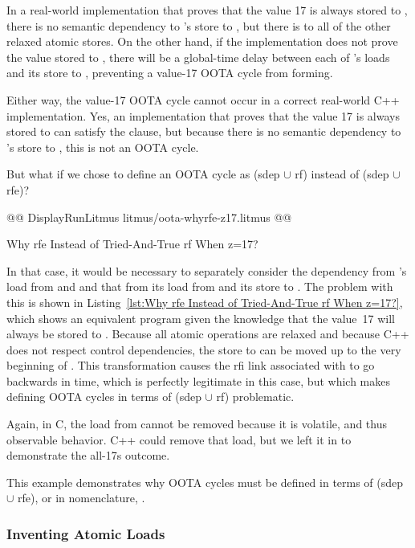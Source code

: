 \documentclass[10]{article}
\begin{document}
In a real-world implementation that proves that the value 17 is always
stored to , there is no semantic dependency to
's store to , but there is to all of the other relaxed
atomic stores.
On the other hand, if the implementation does not prove the value
stored to , there will be a global-time delay between each of
's loads and its store to , preventing a value-17 OOTA
cycle from forming.

Either way, the value-17 OOTA cycle cannot occur in a correct real-world
C++ implementation.
Yes, an implementation that proves that the value 17 is always
stored to  can satisfy the  clause, but because
there is no semantic dependency to 's store to ,
this is not an OOTA cycle.

But what if we chose to define an OOTA cycle as (sdep $\cup$ rf) instead
of (sdep $\cup$ rfe)?

\begin{listing}[tbp]
@@ DisplayRunLitmus litmus/oota-whyrfe-z17.litmus @@
\caption{Why rfe Instead of Tried-And-True rf When z=17?}
\label{lst:Why rfe Instead of Tried-And-True rf When z=17?}
\end{listing}

In that case, it would be necessary to separately consider the dependency
from 's load from  and  and that from its load
from  and its store to .
The problem with this is shown in
Listing~\ref{lst:Why rfe Instead of Tried-And-True rf When z=17?},
which shows an equivalent program given the knowledge that the value~17
will always be stored to .
Because all atomic operations are relaxed and because C++ does not
respect control dependencies, the store to  can be moved up
to the very beginning of .
This transformation causes the rfi link associated with  to
go backwards in time, which is perfectly legitimate in this case,
but which makes defining OOTA cycles in terms of (sdep $\cup$ rf)
problematic.

Again, in C, the load from  cannot be removed because it is
volatile, and thus observable behavior.
C++ could remove that load, but we left it in to demonstrate the all-17s
outcome.

This example demonstrates why OOTA cycles must be defined in terms
of (sdep $\cup$ rfe), or in  nomenclature,
.

\subsubsection{Inventing Atomic Loads}
\label{app:Inventing Atomic Loads}
\end{document}
